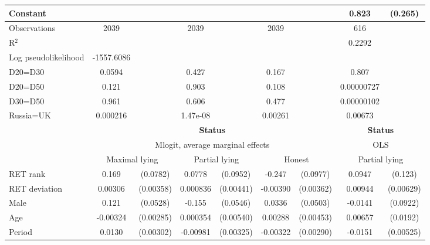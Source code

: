 \begin{tabular}{l|cccccc|cc}
Constant        &                  &         &                  &         &                  &         &    0.823\sym{***}&  (0.265)\\
\hline
Observations    &     2039         &         &     2039         &         &     2039         &         &      616         &         \\
R$^2$      &                  &         &                  &         &                  &         &         0.2292  &   \\ 
Log pseudolikelihood  & -1557.6086   &         &                  &         &                  &         &           &   \\ 
D20=D30         &   0.0594         &         &    0.427         &         &    0.167         &         &    0.807         &         \\
D20=D50         &    0.121         &         &    0.903         &         &    0.108         &         &0.00000727         &         \\
D30=D50         &    0.961         &         &    0.606         &         &    0.477         &         &0.00000102         &         \\
Russia=UK       & 0.000216         &         & 1.47e-08         &         &  0.00261         &         &  0.00673         &         \\
\hline\hline
&\multicolumn{6}{c|}{\bf Status}&\multicolumn{2}{c}{\bf Status}\\ &\multicolumn{6}{c|}{Mlogit, average marginal effects }&\multicolumn{2}{c}{OLS}\\
                &\multicolumn{2}{c}{Maximal lying}&\multicolumn{2}{c}{Partial lying}&\multicolumn{2}{c}{Honest}  &\multicolumn{2}{c}{Partial lying}\\
\hline
RET rank        &    0.169\sym{**} & (0.0782)&   0.0778         & (0.0952)&   -0.247\sym{**} & (0.0977)&   0.0947         &  (0.123)\\
RET deviation   &  0.00306         &(0.00358)& 0.000836         &(0.00441)& -0.00390         &(0.00362)&  0.00944         &(0.00629)\\
Male            &    0.121\sym{**} & (0.0528)&   -0.155\sym{***}& (0.0546)&   0.0336         & (0.0503)&  -0.0141         & (0.0922)\\
Age             & -0.00324         &(0.00285)& 0.000354         &(0.00540)&  0.00288         &(0.00453)&  0.00657         & (0.0192)\\
Period          &   0.0130\sym{***}&(0.00302)& -0.00981\sym{***}&(0.00325)& -0.00322         &(0.00290)&  -0.0151\sym{***}&(0.00525)\\

\end{tabular}
